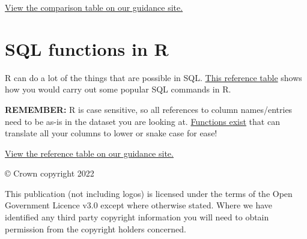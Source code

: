 \documentclass[
  12pt,
]{article}
\begin{document}
\href{https://rsconnect/rsc/stats-production-guidance/r.html\#Excel_functions_in_R}{View
the comparison table on our guidance site.}

\hypertarget{sql-functions-in-r}{%
\section{SQL functions in R}\label{sql-functions-in-r}}

R can do a lot of the things that are possible in SQL.
\href{https://rsconnect/rsc/stats-production-guidance/r.html\#SQL_functions_in_R}{This
reference table} shows how you would carry out some popular SQL commands
in R.

\textbf{REMEMBER:} R is case sensitive, so all references to column
names/entries need to be as-is in the dataset you are looking at.
\href{https://www.rdocumentation.org/packages/janitor/versions/1.2.0/topics/clean_names}{Functions
exist} that can translate all your columns to lower or snake case for
ease!

\href{https://rsconnect/rsc/stats-production-guidance/r.html\#SQL_functions_in_R}{View
the reference table on our guidance site.}

\newpage

\vspace*{\fill}
\color{black}

© Crown copyright 2022

This publication (not including logos) is licensed under the terms of
the Open Government Licence v3.0 except where otherwise stated. Where we
have identified any third party copyright information you will need to
obtain permission from the copyright holders concerned.
\end{document}
